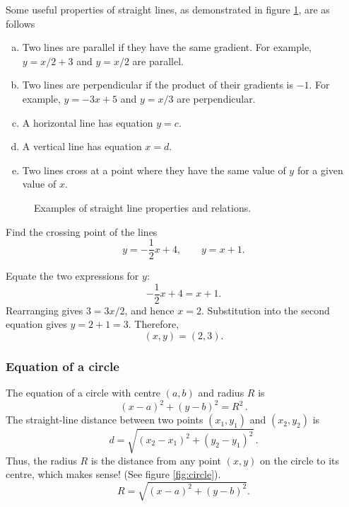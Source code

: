 Some useful properties of straight lines, as demonstrated in figure \ref{fig:lines_props}, are as follows
\begin{enumerate}[(a)]
    \item Two lines are parallel if they have the same gradient. For example, $y=x/2+3$ and $y=x/2$ are parallel. 
    \item Two lines are perpendicular if the product of their gradients is $-1$. For example, $y=-3x+5$ and $y=x/3$ are perpendicular.
    \item  A horizontal line has equation $y=c$.
    \item A vertical line has equation $x=d$. 
    \item Two lines cross at a point where they have the same value of $y$ for a given value of $x$.
\end{enumerate}

\begin{figure}[h!]
\centering
{}
\hfill
{}
\hfill
{}
\hfill
{}
\hfill
{}
\caption{Examples of straight line properties and relations.}
\label{fig:lines_props}
\end{figure}
 
\newtexpage
\begin{example}[DIY]
Find the crossing point of the lines
\[
y=-\frac{1}{2}x+4, \qquad y=x+1.
\]
\end{example}

\begin{blanksol}
Equate the two expressions for $y$:
\[
-\frac{1}{2}x+4=x+1.
\]
Rearranging gives $3=3x/2$, and hence $x=2$. Substitution into the second equation gives $y=2+1=3$. Therefore,
\[
(x,y)=(2,3).
\]
\end{blanksol}

\newtexpage
\subsubsection{Equation of a circle}

The equation of a circle with centre $(a,b)$ and radius $R$ is
\[
(x-a)^2+(y-b)^2=R^2 \,.
\]
The straight-line distance between two points $(x_1,y_1)$ and $(x_2,y_2)$ is
\[
d=\sqrt{(x_2-x_1)^2+(y_2-y_1)^2} \,.
\]
Thus, the radius $R$ is the distance from any point $(x,y)$ on the circle to its centre, which makes sense! (See figure \ref{fig:circle}).
\[
R=\sqrt{(x-a)^2+(y-b)^2}.
\]

